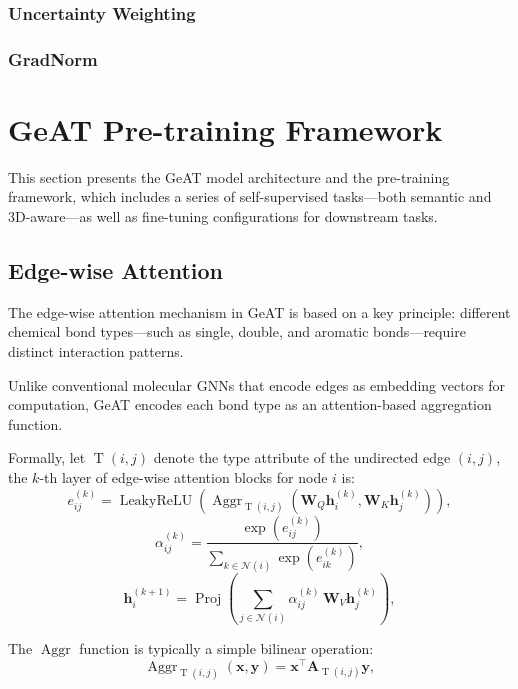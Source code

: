 \documentclass{article}
\theoremstyle{plain}
\theoremstyle{definition}
\theoremstyle{remark}
\begin{document}
\subsubsection{Uncertainty Weighting}
\subsubsection{GradNorm}

\section{GeAT Pre-training Framework}
This section presents the GeAT model architecture and the pre-training framework, which includes a series of self-supervised tasks—both semantic and 3D-aware—as well as fine-tuning configurations for downstream tasks.

\subsection{Edge-wise Attention}
The edge-wise attention mechanism in GeAT is based on a key principle: different chemical bond types—such as single, double, and aromatic bonds—require distinct interaction patterns. 

Unlike conventional molecular GNNs that encode edges as embedding vectors for computation, GeAT encodes each bond type as an attention-based aggregation function. 

Formally, let $\operatorname{T}(i,j)$ denote the type attribute of the undirected edge $(i,j)$, the $k$-th layer of edge-wise attention blocks for node $i$ is: 
\begin{equation}
e_{ij}^{(k)} = \operatorname{LeakyReLU}\left(\operatorname{Aggr}_{\operatorname{T}(i,j)}\left(\mathbf{W}_{Q}\mathbf{h}_i^{(k)}, \mathbf{W}_{K}\mathbf{h}_j^{(k)} \right)\right),  
\end{equation}
\begin{equation}
\alpha_{ij}^{(k)} = \frac{\exp(e_{ij}^{(k)})}{\sum_{k \in \mathcal{N}(i)} \exp(e_{ik}^{(k)})},
\end{equation}
\begin{equation}
\mathbf{h}_i^{(k+1)} = \operatorname{Proj}\left( \sum_{j \in \mathcal{N}(i)} \alpha_{ij}^{(k)} \, \mathbf{W}_V \mathbf{h}_j^{(k)} \right),  
\end{equation}

The $\operatorname{Aggr}$ function is typically a simple bilinear operation:
\begin{equation}
\operatorname{Aggr}_{\operatorname{T}(i,j)}\left(\mathbf{x},\mathbf{y}\right)=\mathbf{x}^\top\mathbf{A}_{\operatorname{T}(i,j)}\mathbf{y}, 
\end{equation}
\end{document}
